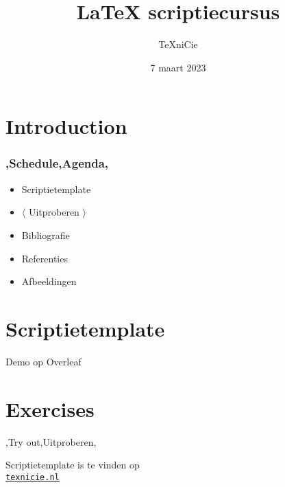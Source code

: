 \documentclass[
    dutch,
    everyoneauthor=true,
    defaultSlideCollection=vincent,
]{../../cursuspresentatie}
\title[\LaTeX{} scriptiecursus]{\LaTeX{} scriptiecursus}
\author[\TeX niCie]{\TeX niCie}%
\date{7 maart 2023}
\begin{document}
\def\placetarget{\hypertarget{introduction}{}}
\section{Introduction}



\begin{frame}
    \frametitle{\lang,Schedule,Agenda,}
    
    \begin{itemize}[label=\textbullet]
        \item Scriptietemplate
        \item $ \langle $ Uitproberen $ \rangle $
        \item Bibliografie
        \item Referenties
        \item Afbeeldingen
    \end{itemize}
\end{frame}

\section{Scriptietemplate}
\begin{frame}
    Demo op Overleaf
\end{frame}


\section{Exercises}
\def\placetarget{\hypertarget{exercises1}{}}

\begin{frame}
    \begin{center}
        {\LARGE \lang,Try out,Uitproberen,}
        \vspace{30pt}

        


        {\Large Scriptietemplate is te vinden op\\
         \href{https://texnicie.nl}{\ul{\texttt{texnicie.nl}}}}
    \end{center}
\end{frame}
\end{document}
